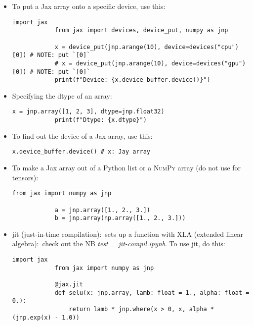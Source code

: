 \documentclass[12pt, a4paper]{article}
\numberwithin{equation}{section}
\theoremstyle{definition}
\theoremstyle{definition}
\begin{document}
	\begin{itemize}
		\item To put a Jax array onto a specific device, use this: 
		
		\begin{lstlisting}[style=mystylepython, label=alg:jax_device, xleftmargin=\parindent]
			import jax
			from jax import devices, device_put, numpy as jnp
			
			x = device_put(jnp.arange(10), device=devices("cpu")[0]) # NOTE: put `[0]`
			# x = device_put(jnp.arange(10), device=devices("gpu")[0]) # NOTE: put `[0]`
			print(f"Device: {x.device_buffer.device()}")
		\end{lstlisting}
		
		\item Specifying the dtype of an array: 
		
		\begin{lstlisting}[style=mystylepython, label=alg:jax_dtype, xleftmargin=\parindent]
			x = jnp.array([1, 2, 3], dtype=jnp.float32)
			print(f"Dtype: {x.dtype}")
		\end{lstlisting}
	
		\item To find out the device of a Jax array, use this:
		
		\begin{lstlisting}[style=mystylepython, label=alg:jax__dev_retrieval, xleftmargin=\parindent]
			x.device_buffer.device() # x: Jay array
		\end{lstlisting}
	
		\item To make a Jax array out of a Python list or a \textsc{NumPy} array  (do not use for \textsc{} tensors): 
		
		\begin{lstlisting}[style=mystylepython, label=alg:jax_array_crea, xleftmargin=\parindent]
			from jax import numpy as jnp
			
			a = jnp.array([1., 2., 3.])
			b = jnp.array(np.array([1., 2., 3.]))
		\end{lstlisting}

		\item jit (just-in-time compilation):~sets up a function with XLA (extended linear algebra):~check out the NB \textit{test\_\_jit-compil.ipynb}. To use jit, do this: 
		
		\begin{lstlisting}[style=mystylepython, label=alg:jax_jit, xleftmargin=\parindent]
			import jax
			from jax import numpy as jnp
			
			@jax.jit
			def selu(x: jnp.array, lamb: float = 1., alpha: float = 0.): 
				return lamb * jnp.where(x > 0, x, alpha * (jnp.exp(x) - 1.0))
		\end{lstlisting}
	\end{itemize}
\end{document}
